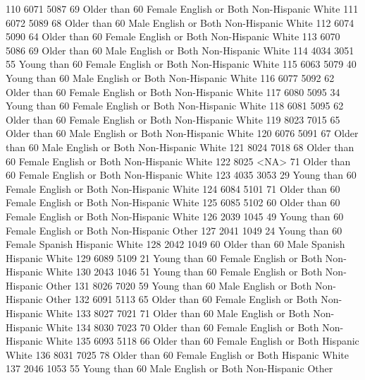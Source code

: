 \documentclass[
  letterpaper,
  DIV=11,
  numbers=noendperiod]{scrreprt}
\newenvironment{Shaded}{\begin{snugshade}}{\end{snugshade}}
\newcommand{\NormalTok}[1]{\textcolor[rgb]{0.00,0.23,0.31}{#1}}
\begin{document}
\begin{Shaded}
\begin{Highlighting}[]
\NormalTok{110 6071 5087  69 Older than 60 Female English or Both Non{-}Hispanic      White}
\NormalTok{111 6072 5089  68 Older than 60   Male English or Both Non{-}Hispanic      White}
\NormalTok{112 6074 5090  64 Older than 60 Female English or Both Non{-}Hispanic      White}
\NormalTok{113 6070 5086  69 Older than 60   Male English or Both Non{-}Hispanic      White}
\NormalTok{114 4034 3051  55 Young than 60 Female English or Both Non{-}Hispanic      White}
\NormalTok{115 6063 5079  40 Young than 60   Male English or Both Non{-}Hispanic      White}
\NormalTok{116 6077 5092  62 Older than 60 Female English or Both Non{-}Hispanic      White}
\NormalTok{117 6080 5095  34 Young than 60 Female English or Both Non{-}Hispanic      White}
\NormalTok{118 6081 5095  62 Older than 60 Female English or Both Non{-}Hispanic      White}
\NormalTok{119 8023 7015  65 Older than 60   Male English or Both Non{-}Hispanic      White}
\NormalTok{120 6076 5091  67 Older than 60   Male English or Both Non{-}Hispanic      White}
\NormalTok{121 8024 7018  68 Older than 60 Female English or Both Non{-}Hispanic      White}
\NormalTok{122 8025 \textless{}NA\textgreater{}  71 Older than 60 Female English or Both Non{-}Hispanic      White}
\NormalTok{123 4035 3053  29 Young than 60 Female English or Both Non{-}Hispanic      White}
\NormalTok{124 6084 5101  71 Older than 60 Female English or Both Non{-}Hispanic      White}
\NormalTok{125 6085 5102  60 Older than 60 Female English or Both Non{-}Hispanic      White}
\NormalTok{126 2039 1045  49 Young than 60 Female English or Both Non{-}Hispanic      Other}
\NormalTok{127 2041 1049  24 Young than 60 Female         Spanish     Hispanic      White}
\NormalTok{128 2042 1049  60 Older than 60   Male         Spanish     Hispanic      White}
\NormalTok{129 6089 5109  21 Young than 60 Female English or Both Non{-}Hispanic      White}
\NormalTok{130 2043 1046  51 Young than 60 Female English or Both Non{-}Hispanic      Other}
\NormalTok{131 8026 7020  59 Young than 60   Male English or Both Non{-}Hispanic      Other}
\NormalTok{132 6091 5113  65 Older than 60 Female English or Both Non{-}Hispanic      White}
\NormalTok{133 8027 7021  71 Older than 60   Male English or Both Non{-}Hispanic      White}
\NormalTok{134 8030 7023  70 Older than 60 Female English or Both Non{-}Hispanic      White}
\NormalTok{135 6093 5118  66 Older than 60 Female English or Both     Hispanic      White}
\NormalTok{136 8031 7025  78 Older than 60 Female English or Both     Hispanic      White}
\NormalTok{137 2046 1053  55 Young than 60   Male English or Both Non{-}Hispanic      Other}

\end{Highlighting}
\end{Shaded}
\end{document}
